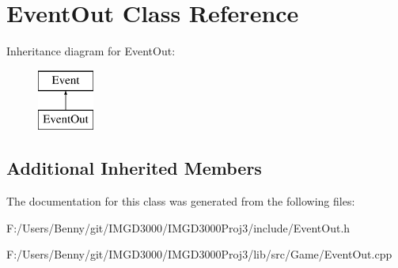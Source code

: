 \hypertarget{class_event_out}{\section{Event\+Out Class Reference}
\label{class_event_out}
}
Inheritance diagram for Event\+Out\+:\begin{figure}[H]
\begin{center}
\leavevmode
\includegraphics[height=2.000000cm]{class_event_out}
\end{center}
\end{figure}
\subsection*{Additional Inherited Members}


The documentation for this class was generated from the following files\+:\begin{DoxyCompactItemize}
\item 
F\+:/\+Users/\+Benny/git/\+I\+M\+G\+D3000/\+I\+M\+G\+D3000\+Proj3/include/Event\+Out.\+h\item 
F\+:/\+Users/\+Benny/git/\+I\+M\+G\+D3000/\+I\+M\+G\+D3000\+Proj3/lib/src/\+Game/Event\+Out.\+cpp\end{DoxyCompactItemize}
